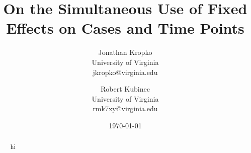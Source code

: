 \documentclass{article}[12pt]
\begin{document}
\title{On the Simultaneous Use of Fixed Effects on Cases and Time Points}
\date{\today}
\author{Jonathan Kropko\\ University of Virginia \\ jkropko@virginia.edu \and Robert Kubinec \\University of Virginia\\rmk7xy@virginia.edu}
\maketitle
\begin{abstract}
hi
\end{abstract}
\end{document}
